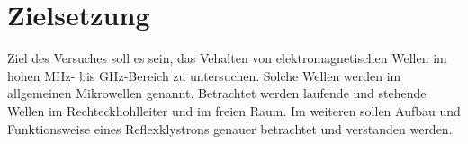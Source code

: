 \section{Zielsetzung}
\label{sec:ziel}
Ziel des Versuches soll es sein, das Vehalten von elektromagnetischen Wellen im hohen MHz- 
bis GHz-Bereich zu untersuchen. Solche Wellen werden im allgemeinen Mikrowellen genannt.
Betrachtet werden laufende und stehende Wellen im Rechteckhohlleiter und im freien Raum.
Im weiteren sollen Aufbau und Funktionsweise eines Reflexklystrons genauer betrachtet
und verstanden werden. 

